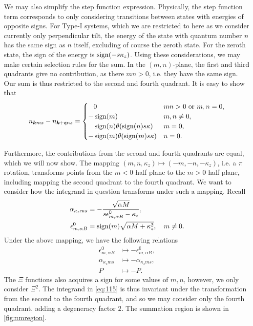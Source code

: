 We may also simplify the step function expression.
Physically, the step function term corresponds to only considering transitions between states with energies of opposite signs.
For Type-I systems, which we are restricted to here as we consider currently only perpendicular tilt, the energy of the state with quantum number \( n \) has the same sign as \( n \) itself, excluding of course the zeroth state.
For the zeroth state, the sign of the energy is \( \operatorname{sign}(-s \kappa_z) \).
Using these considerations, we may make certain selection rules for the sum.
In the \( (m,n) \)-plane, the first and third quadrants give no contribution, as there \( m n > 0 \), i.e. they have the same sign.
Our sum is thus restricted to the second and fourth quadrant.
It is easy to show that
\begin{equation}
  \label{eq:116}
  n_{\bm{k} m s} - n_{\bm{k} + \mathfrak{q} n s} =
  \begin{cases}
    \phantom{-} 0 & m n > 0 \text{ or  } m,n = 0,\\
    - \operatorname{sign}(m) & m,n \neq 0,\\
    \phantom{-} \operatorname{sign}(n) \theta(\operatorname{sign}(n) s \kappa) & m = 0,\\
    -\operatorname{sign}(m) \theta(\operatorname{sign}(m) s \kappa) & n = 0.
  \end{cases}
\end{equation}

Furthermore, the contributions from the second and fourth quadrants are equal, which we will now show.
The mapping \( (m,n, \kappa_z) \mapsto (-m, -n, -\kappa_z) \), i.e. a \( \pi \) rotation, transforms points from the \( m < 0 \) half plane to the \( m > 0 \) half plane, including mapping the second quadrant to the fourth quadrant.
We want to consider how the integrand in question transforms under such a mapping.
Recall
\begin{align*}
  \alpha_{\kappa_z m s} &= - \frac{\sqrt{\alpha M} }{s \epsilon_{m, \alpha B}^0 - \kappa_z},\\
  \epsilon_{m, \alpha B}^0 &= \operatorname{sign}(m) \sqrt{\alpha M + \kappa_z^2}, \quad m \neq 0.
\end{align*}
Under the above mapping, we have the following relations
\begin{align}
  \label{eq:117}
  \epsilon_{m, \alpha B}^0 &\mapsto -\epsilon_{m, \alpha B}^0,\\
  \alpha_{\kappa_z m s} &\mapsto -\alpha_{\kappa_z m s},\\
  P &\mapsto -P.
\end{align}
The \( \Xi \) functions also acquires a sign for some values of \( m,n \), however, we only consider \( \Xi^2 \).
The integrand in \cref{eq:115} is thus invariant under the transformation from the second to the fourth quadrant, and so we may consider only the fourth quadrant, adding a degeneracy factor 2.
The summation region is shown in \cref{fig:nmregion}.

